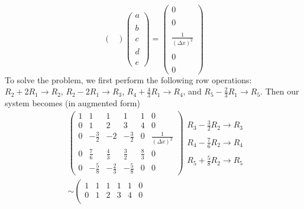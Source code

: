 \documentclass{article}
\begin{document}
\begin{itemize}
\[\begin{pmatrix}
    \end{pmatrix}\begin{pmatrix}
        a\\\\
        b\\\\
        c\\\\
        d\\\\
        e
    \end{pmatrix} = \begin{pmatrix}
        0\\\\
        0\\\\
        \tfrac{1}{(\Delta x)^2}\\\\
        0\\\\
        0
    \end{pmatrix}\]
    To solve the problem, we first perform the following row operations: $R_2 + 2R_1 \to R_2$, $R_2 - 2R_1 \to R_3$, $R_4 + \tfrac{4}{3}R_1 \to R_4$, and $R_5 - \tfrac{2}{3}R_1 \to R_5$. Then our system becomes (in augmented form)
    \begin{align*}
    &\left(\begin{array}{ccccc|c}
        1 & 1 & 1 & 1 & 1 & 0\\
        0 & 1 & 2 & 3 & 4 & 0\\
        0 & -\tfrac{3}{2} & -2 & -\tfrac{3}{2} & 0 & \tfrac{1}{(\Delta x)^2}\\
        0 & \tfrac{7}{6} & \tfrac{4}{3} & \tfrac{3}{2} & \tfrac{8}{3} & 0\\
        0 & -\tfrac{5}{8} & -\tfrac{2}{3} & -\tfrac{5}{8} & 0 & 0
    \end{array}\right)\begin{array}{c}
        R_3 - \tfrac{3}{2}R_2 \to R_3\\\\
        R_4 - \tfrac{7}{6}R_2 \to R_4\\\\
        R_5 + \tfrac{5}{8}R_2 \to R_5
    \end{array}\\
    &\sim\left(\begin{array}{ccccc|c}
        1 & 1 & 1 & 1 & 1 & 0\\
        0 & 1 & 2 & 3 & 4 & 0\\

\end{array}
\end{align*}
\end{itemize}
\end{document}
